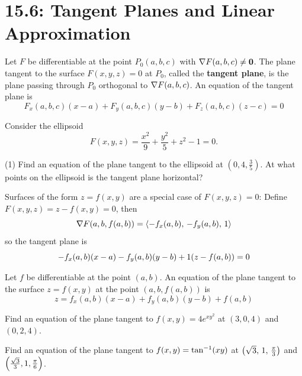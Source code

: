 \documentclass[mathNotesPreamble]{subfiles}
\begin{document}
\section{15.6: Tangent Planes and Linear Approximation}

  \begin{defn*}[Equation of the Tangent Plane for $F(x,y,z)=0$]
    Let $F$ be differentiable at the point $P_0(a,b,c)$ with $\nabla F(a,b,c)\neq \mathbf{0}$. The plane tangent to the surface $F(x,y,z)=0$ at $P_0$, called the \textbf{tangent plane}, is the plane passing through $P_0$ orthogonal to $\nabla F(a,b,c)$. An equation of the tangent plane is
      \[F_x(a,b,c)(x-a)+F_y(a,b,c)(y-b)+F_z(a,b,c)(z-c)=0\]
  \end{defn*}

  \begin{ex*}
    Consider the ellipsoid 
      \[F(x,y,z)= \frac{x^2}{9}+\frac{y^2}{5}+z^2-1=0.\]
    \begin{tasks}[after-item-skip=\stretch{1}](1)
      \task Find an equation of the plane tangent to the ellipsoid at $(0,4, \frac{3}{5})$.
      \task At what points on the ellipsoid is the tangent plane horizontal?
    \end{tasks}
  \end{ex*}
  \pagebreak

  Surfaces of the form $z=f(x,y)$ are a special case of $F(x,y,z)=0$: Define $F(x,y,z)=z-f(x,y)=0$, then
    \[\nabla F{\left(a,b,f(a,b)\right)}={\left\langle -f_x(a,b),\,-f_y(a,b),\,1 \right\rangle}\]
  so the tangent plane is
    \[-f_x(a,b)(x-a)-f_y(a,b)(y-b)+1{\left(z-f(a,b)\right)}=0\]
  \begin{thmBox*}[Tangent Plane for $z=f(x,y)$]
    Let $f$ be differentiable at the point $(a,b)$. An equation of the plane tangent to the surface $z=f(x,y)$ at the point $(a,b,f(a,b))$ is
      \[z=f_x(a,b)(x-a)+f_y(a,b)(y-b)+f(a,b)\]
  \end{thmBox*}

  \begin{ex*}
    Find an equation of the plane tangent to $f(x,y)=4e^{xy^2}$ at $(3,0,4)$ and $(0,2,4)$.
  \end{ex*}
  \pagebreak

  \begin{ex*}
    Find an equation of the plane tangent to $f(x,y)=\tan^{-1}(xy)$ at ${\left(\sqrt{3},\,1,\,\frac{\pi}{3}\right)}$ and ${\left(\frac{\sqrt{3}}{3},1,\frac{\pi}{6}\right)}$.
  \end{ex*}
\end{document}
